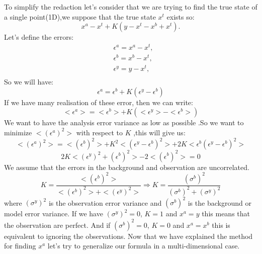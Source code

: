 To simplify the redaction let's consider that we are trying to find the true state of a single point(1D),we suppose that the true state $x^t$ exists so:
$$x^a-x^t+K(y-x^t-x^b+x^t).$$
Let's define the errors:
$$\begin{aligned}
&\epsilon^a=x^a-x^t, \\
&\epsilon^b=x^b-x^t, \\
&\epsilon^y=y-x^t, \\
\end{aligned}$$
So we will have:
$$\epsilon^a=\epsilon^b+K(\epsilon^y-\epsilon^b)$$
If we have many realisation of these error, then we can write:
$$<\epsilon^a>=<\epsilon^b>+K(<\epsilon^y>-<\epsilon^b>)$$
We want to have the analysis error variance as low as possible .So we want to minimize $<(\epsilon^a)^2>$ with respect to $K$ ,this will give us:
$$<(\epsilon^a)^2>=<(\epsilon^b)^2>+K^2<(\epsilon^y-\epsilon^b)^2>+2K<\epsilon^b(\epsilon^y-\epsilon^b)^2>$$
$$2K<(\epsilon^y)^2+(\epsilon^b)^2>-2<(\epsilon^b)^2>=0$$
\noindent We assume that the errors in the background and observation are uncorrelated.
$$K=\frac{<(\epsilon^b)^2>}{<(\epsilon^b)^2>+<(\epsilon^y)^2>} \Rightarrow K=\frac{(\sigma^b)^2}{(\sigma^b)^2+(\sigma^y)^2} $$
where $(\sigma^y)^2$ is the observation error variance and $(\sigma^b)^2$ is the background or model error variance.
\newline\noindent If we have $(\sigma^y)^2=0$, $K=1$ and $x^a=y$  this means that the observation are perfect.
\newline\noindent And if $(\sigma^b)^2=0$, $K=0$ and $x^a=x^b$ this is equivalent to ignoring the observations.
\vspace*{5mm}
\newline Now that we have explained the method for finding $x^a$ let's try to generalize our formula in a multi-dimensional case.

